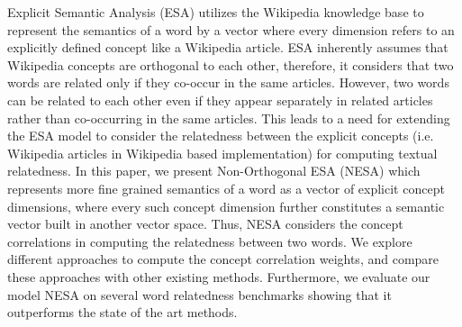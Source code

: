 Explicit Semantic Analysis (ESA) utilizes the Wikipedia knowledge base to represent the semantics of a word by a vector where every dimension refers to an explicitly defined concept like a Wikipedia article. ESA inherently assumes that Wikipedia concepts are orthogonal to each other, therefore, it considers that two words are related only if they co-occur in the same articles. However, two words can be related to each other even if they appear separately in related articles rather than co-occurring in the same articles. This leads to a need for extending the ESA model to consider the relatedness between the explicit concepts (i.e. Wikipedia articles in Wikipedia based implementation) for computing textual relatedness. In this paper, we present Non-Orthogonal ESA (NESA) which represents more fine grained semantics of a word as a vector of explicit concept dimensions, where every such concept dimension further constitutes a semantic vector built in another vector space. Thus, NESA considers the concept correlations in computing the relatedness between two words. We explore different approaches to compute the concept correlation weights, and compare these approaches with other existing methods. Furthermore, we evaluate our model NESA on several word relatedness benchmarks showing that it outperforms the state of the art methods.
